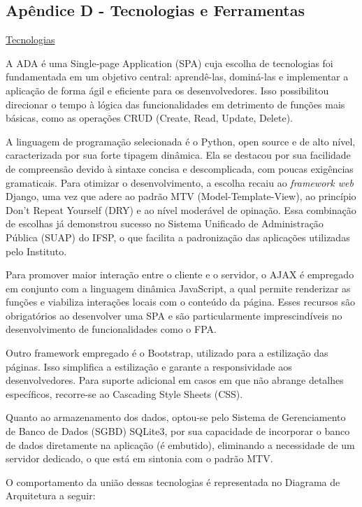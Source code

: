 \documentclass[12pt]{article}
\begin{document}
\subsection{Apêndice D - Tecnologias e Ferramentas}
\underline{Tecnologias}
\par A ADA é uma Single-page Application (SPA) cuja escolha de tecnologias foi fundamentada em um objetivo central: aprendê-las, dominá-las e implementar a aplicação de forma ágil e eficiente para os desenvolvedores. Isso possibilitou direcionar o tempo à lógica das funcionalidades em detrimento de funções mais básicas, como as operações CRUD (Create, Read, Update, Delete).
\par A linguagem de programação selecionada é o Python, open source e de alto nível, caracterizada por sua forte tipagem dinâmica. Ela se destacou por sua facilidade de compreensão devido à sintaxe concisa e descomplicada, com poucas exigências gramaticais. Para otimizar o desenvolvimento, a escolha recaiu ao \textit{framework web} Django, uma vez que adere ao padrão MTV (Model-Template-View), ao princípio Don't Repeat Yourself (DRY) e ao nível moderável de opinação. Essa combinação de escolhas já demonstrou sucesso no Sistema Unificado de Administração Pública (SUAP) do IFSP, o que facilita a padronização das aplicações utilizadas pelo Instituto.
\par Para promover maior interação entre o cliente e o servidor, o AJAX é empregado em conjunto com a linguagem dinâmica JavaScript, a qual permite renderizar as funções e viabiliza interações locais com o conteúdo da página. Esses recursos são obrigatórios ao desenvolver uma SPA e são particularmente imprescindíveis no desenvolvimento de funcionalidades como o FPA. 
\par Outro framework empregado é o Bootstrap, utilizado para a estilização das páginas. Isso simplifica a estilização e garante a responsividade aos desenvolvedores. Para suporte adicional em casos em que não abrange detalhes específicos, recorre-se ao Cascading Style Sheets (CSS).
\par Quanto ao armazenamento dos dados, optou-se pelo Sistema de Gerenciamento de Banco de Dados (SGBD) SQLite3, por sua capacidade de incorporar o banco de dados diretamente na aplicação (é embutido), eliminando a necessidade de um servidor dedicado, o que está em sintonia com o padrão MTV. 
\par O comportamento da união dessas tecnologias é representada no Diagrama de Arquitetura a seguir:
\end{document}

